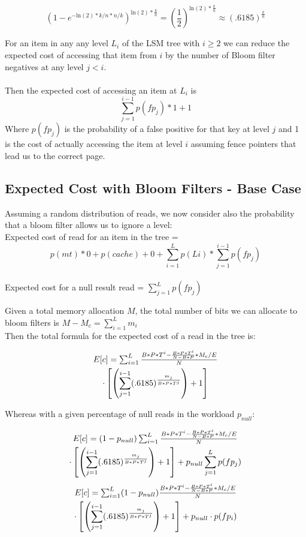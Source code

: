 \documentclass{sig-alternate-05-2015}
\begin{document}
$$
(1 - e^{-\mathrm{ln}(2)*k/n*n/k})^{\mathrm{ln}(2) * \frac{k}{n}} = (\frac{1}{2}) ^ {\mathrm{ln}(2) * \frac{k}{n}} \approx (.6185) ^  {\frac{k}{n}}
$$

For an item in any any level $L_i$ of the LSM tree with $i \geq 2$ we can
reduce the expected cost of accessing that item from $i$ by the number of Bloom
filter negatives at any level $j<i$. \\ \\ Then the expected cost of accessing
an item at $L_i$ is  $$\sum_{j=1}^{i-1} p(fp_j) * 1 + 1$$ Where $p(fp_j)$ is
the probability of a false positive for that key at level $j$ and 1 is the cost
of actually accessing the item at level $i$ assuming fence pointers that lead
us to the correct page.

\subsection{Expected Cost with Bloom Filters - Base Case}

Assuming a random distribution of reads, we now consider also the probability that a bloom filter allows us to ignore a level: \\
Expected cost of read for an item in the tree = $$p(mt) * 0  + p(cache) + 0 + \sum_{i=1}^L p(Li) * \sum_{j=1}^{i-1} p(fp_j)$$ \\
Expected cost for a null result read = $\sum_{j=1}^{L} p(fp_j)$

Given a total memory allocation $M$, the total number of bits we can allocate
to bloom filters is $M-M_c = \sum_{i=1}^L m_i$ \\ Then the total formula for
the expected cost of a read in the tree is: 

\begin{multline}
$$E[c] = \sum_{i=1}^{L} \frac{B*P*T^i - \frac{B*P*T^i}{N-B*P} * M_c/E}{N} \\ \cdot \left[ \left(\sum_{j=1}^{i-1} (.6185) ^  {\frac{m_j}{B*P*T^j}}\right) +1 \right]$$ 
\end{multline}

Whereas with a given percentage of null reads in the workload $p_{null}$:

\begin{multline}
$$E[c] = (1-p_{null})\sum_{i=1}^{L} \frac{B*P*T^i - \frac{B*P*T^i}{N-B*P} * M_c/E}{N} \\ \cdot \left[ \left(\sum_{j=1}^{i-1} (.6185) ^  {\frac{m_j}{B*P*T^j}}\right) +1 \right] + p_{null}\sum_{j=1}^{L} p(fp_j)$$
\end{multline}
\begin{multline}
$$E[c] = \sum_{i=1}^{L} (1-p_{null})\frac{B*P*T^i - \frac{B*P*T^i}{N-B*P} * M_c/E}{N} \\ \cdot \left[ \left(\sum_{j=1}^{i-1} (.6185) ^  {\frac{m_j}{B*P*T^j}}\right) +1 \right] + p_{null} \cdot p(fp_i) $$
\end{multline}
\end{document}
